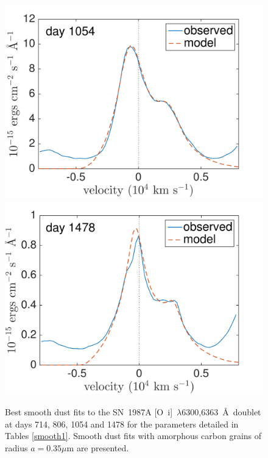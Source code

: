 \begin{figure}
\includegraphics[trim =0 0 0 -20,clip=true,scale=0.37]{chapters/chapter5/images/smooth/best_fit/d1054OI.pdf}
\hspace{0mm}
\includegraphics[trim =0 0 0 -20,clip=true,scale=0.37]{chapters/chapter5/images/smooth/best_fit/d1478OI.pdf}
\caption{Best smooth dust fits to the SN~1987A [O~{\sc i}]~$\lambda$6300,6363~\AA\ doublet at days 714, 806, 1054 and 1478 for the parameters detailed in Tables \ref{smooth1}.  Smooth dust fits with amorphous carbon grains of radius $a=0.35 \mu$m are presented.}
\label{OI_smooth}

\end{figure}

